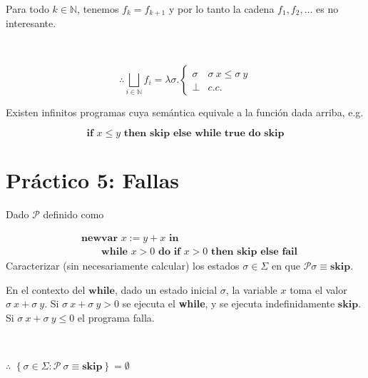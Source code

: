 \documentclass[article, 12pt]{article}
\begin{document}
Para todo $k \in \mathbb{N}$, tenemos $f_k = f_{k+1}$ y por lo
tanto la cadena $f_1, f_2, \ldots$ es no interesante. 

~


\begin{equation*}
  \therefore \bigsqcup_{i \in \mathbb{N}} f_i = \lambda \sigma . \begin{cases}
    \sigma & \sigma ~ x \leq \sigma ~ y \\ 
    \bot  & c.c.
  \end{cases}
\end{equation*}

Existen infinitos programas cuya semántica equivale a la función dada arriba,
e.g.

\begin{equation*}
  \textbf{if } x \leq y \textbf{ then } \textbf{skip} \textbf{ else }
  \textbf{while true do skip} 
\end{equation*}

\pagebreak 

\section{Práctico 5: Fallas}

\begin{myframe}
  Dado $\mathcal{P}$ definido como

  \begin{align*}
    &\textbf{newvar } x := y + x \textbf{ in } \\ 
    &\qquad\textbf{while } x > 0 \textbf{ do } \textbf{if } x > 0 \textbf{ then
    } \textbf{skip} \textbf{ else } \textbf{fail}
  \end{align*}
Caracterizar (sin necesariamente calcular) los estados $\sigma \in \Sigma$ en
que $\mathcal{P}\sigma \equiv \textbf{skip}$.
\end{myframe}

En el contexto del $\textbf{while}$, dado un estado inicial $\sigma$, la
variable $x$ toma el valor $\sigma ~ x + \sigma ~ y$. Si $\sigma ~ x + \sigma ~
y > 0$ se ejecuta el \textbf{while}, y se ejecuta indefinidamente
$\textbf{skip}$. Si $\sigma ~ x + \sigma ~ y \leq 0$ el programa falla.

~

$\therefore $ $\left\{ \sigma \in \Sigma : \mathcal{P}~ \sigma \equiv
\textbf{skip} \right\} = \emptyset$

\pagebreak 
\end{document}

